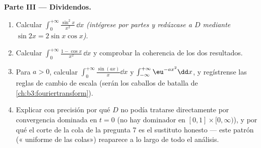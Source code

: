 \begin{problem}
\medskip
\noindent\textbf{Parte III --- Dividendos.}
\begin{enumerate}[resume]
  \item Calcular $\int_0^{+\infty}\frac{\sin^2x}{x^2}\,\dd x$
  \emph{(intégrese por partes y redúzcase a $D$ mediante $\sin
        2x = 2\sin x\cos x$)}. \item Calcular $\int_0^{+\infty}\frac{1 -
        \cos x}{x^2}\,\dd x$ y comprobar la coherencia de los dos
  resultados. \item Para $a > 0$, calcular
  $\int_0^{+\infty}\frac{\sin(ax)}x\dd x$ y
  $\int_{-\infty}^{+\infty}\eu^{-ax^2}\dd x$, y regístrense las reglas
  de cambio de escala (serán los caballos de batalla de
        \cref{ch:b3:fouriertransform}).
  \item Explicar con precisión por qué $D$ no podía tratarse
  directamente por convergencia dominada en $t = 0$ (no hay dominador
   en $[0,1]\times[0,\infty)$), y
  por qué el corte de la cola de la pregunta 7 es el sustituto honesto
  --- este patrón (« uniforme
  de las colas») reaparece a lo largo de todo el análisis.
\end{enumerate}


\end{problem}
